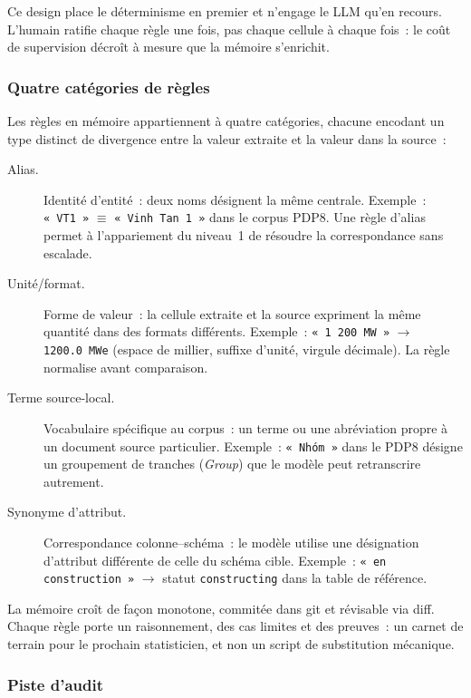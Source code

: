 \noindent Ce design place le déterminisme en premier et n'engage le LLM qu'en
recours. L'humain ratifie chaque règle une fois, pas chaque cellule à chaque
fois~: le coût de supervision décroît à mesure que la mémoire s'enrichit.

\subsubsection{Quatre catégories de règles}\label{sec:verif-rules}

Les règles en mémoire appartiennent à quatre catégories, chacune encodant un
type distinct de divergence entre la valeur extraite et la valeur dans la
source~:

\begin{description}
\item[Alias.]
  Identité d'entité~: deux noms désignent la même centrale.
  Exemple~: \texttt{«~VT1~»} $\equiv$ \texttt{«~Vinh Tan~1~»} dans le
  corpus PDP8. Une règle d'alias permet à l'appariement du niveau~1
  de résoudre la correspondance sans escalade.

\item[Unité/format.]
  Forme de valeur~: la cellule extraite et la source expriment la même
  quantité dans des formats différents.
  Exemple~: \texttt{«~1~200~MW~»} $\to$ \texttt{1200.0~MWe} (espace de
  millier, suffixe d'unité, virgule décimale). La règle normalise avant
  comparaison.

\item[Terme source-local.]
  Vocabulaire spécifique au corpus~: un terme ou une abréviation propre à un
  document source particulier.
  Exemple~: \texttt{«~Nhóm~»} dans le PDP8 désigne un groupement de
  tranches (\emph{Group}) que le modèle peut retranscrire autrement.

\item[Synonyme d'attribut.]
  Correspondance colonne--schéma~: le modèle utilise une désignation
  d'attribut différente de celle du schéma cible.
  Exemple~: \texttt{«~en construction~»} $\to$ statut \texttt{constructing}
  dans la table de référence.
\end{description}

La mémoire croît de façon monotone, commitée dans git et révisable via diff.
Chaque règle porte un raisonnement, des cas limites et des preuves~: un
carnet de terrain pour le prochain statisticien, et non un script de
substitution mécanique.

\subsubsection{Piste d'audit}\label{sec:verif-audit}

